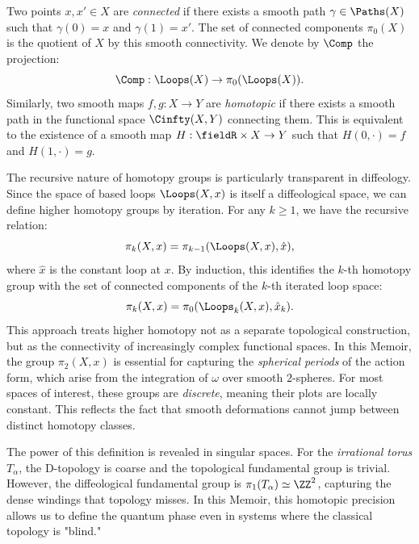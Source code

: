 \begin{article}
  Two points $x, x' \in X$ are \emph{connected} if there exists a smooth path $\gamma \in \Paths(X)$ such that $\gamma(0) = x$ and $\gamma(1) = x'$.
  The set of connected components $\pi_0(X)$ is the quotient of $X$ by this smooth connectivity.
  We denote by $\Comp$ the projection:
  $$
    \Comp: \Loops(X) \to \pi_0(\Loops(X)).
    $$%
  Similarly,
  two smooth maps $f, g: X \to Y$ are \emph{homotopic} if there exists a smooth path in the functional space $\Cinfty(X, Y)$ connecting them.
  This is equivalent to the existence of a smooth map $H: \fieldR \times X \to Y$ such that $H(0, \cdot) = f$ and $H(1, \cdot) = g$.
\end{article}

\begin{article}
  The recursive nature of homotopy groups is particularly transparent in diffeology.
  Since the space of based loops $\Loops(X, x)$ is itself a diffeological space,
  we can define higher homotopy groups by iteration.
  For any $k \geq 1$,
  we have the recursive relation:
  $$
    \pi_k(X, x) = \pi_{k-1}(\Loops(X, x), \hat{x}),
    $$%
  where $\hat{x}$ is the constant loop at $x$.
  By induction,
  this identifies the $k$-th homotopy group with the set of connected components of the $k$-th iterated loop space:
  $$
    \pi_k(X, x) = \pi_0(\Loops_k(X,x), \hat{x}_k).
    $$%
  This approach treats higher homotopy not as a separate topological construction,
  but as the connectivity of increasingly complex functional spaces.
  In this Memoir,
  the group $\pi_2(X, x)$ is essential for capturing the \emph{spherical periods} of the action form,
  which arise from the integration of $\omega$ over smooth $2$-spheres.
  For most spaces of interest,
  these groups are \emph{discrete},
  meaning their plots are locally constant.
  This reflects the fact that smooth deformations cannot jump between distinct homotopy classes.
  
  The power of this definition is revealed in singular spaces.
  For the \emph{irrational torus} $T_\alpha$,
  the D-topology is coarse and the topological fundamental group is trivial.
  However,
  the diffeological fundamental group is $\pi_1(T_\alpha) \simeq \ZZ^2$,
  capturing the dense windings that topology misses.
  In this Memoir,
  this homotopic precision allows us to define the quantum phase even in systems where the classical topology is "blind."
\end{article}

